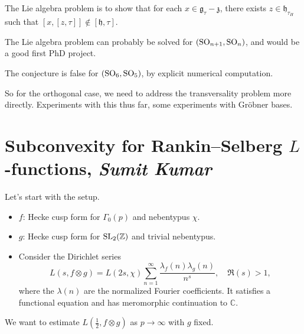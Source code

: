 \documentclass[reqno]{amsart} 
\begin{document}
The Lie algebra problem is to show that for each $x \in \mathfrak{g}_\tau - \mathfrak{z}$, there exists $z \in \mathfrak{h}_{\tau_H}$ such that $[x,[z,\tau]] \notin [\mathfrak{h},\tau]$.

\begin{conjecture}
  The Lie algebra problem can probably be solved for $(\operatorname{SO}_{n+1}, \operatorname{SO}_n)$, and would be a good first PhD project.
\end{conjecture}

\begin{example}
  The conjecture is false for $(\operatorname{SO}_6, \operatorname{SO}_5)$, by explicit numerical computation.
\end{example}

So for the orthogonal case, we need to address the transversality problem more directly.  Experiments with this thus far, some experiments with Gr\"{o}bner bases.

\section{Subconvexity for Rankin--Selberg $L$-functions, \textnormal{\emph{Sumit Kumar}}}

Let's start with the setup.
\begin{itemize}
\item $f$: Hecke cusp form for $\Gamma_0(p)$ and nebentypus $\chi$.
\item $g$: Hecke cusp form for $\operatorname{SL}_2(\mathbb{Z})$ and trivial nebentypus.
\item Consider the Dirichlet series
  \begin{equation*}
    L(s, f \otimes g) = L(2 s, \chi)
    \sum_{n = 1}^\infty \frac{\lambda_f(n) \lambda_g(n)}{ n^s},
    \quad
    \Re(s) > 1,
  \end{equation*}
  where the $\lambda(n)$ are the normalized Fourier coefficients.  It satisfies a functional equation and has meromorphic continuation to $\mathbb{C}$.
\end{itemize}

We want to estimate $L(\tfrac{1}{2}, f \otimes g)$ as $p \rightarrow \infty$ with $g$ fixed.
\end{document}
